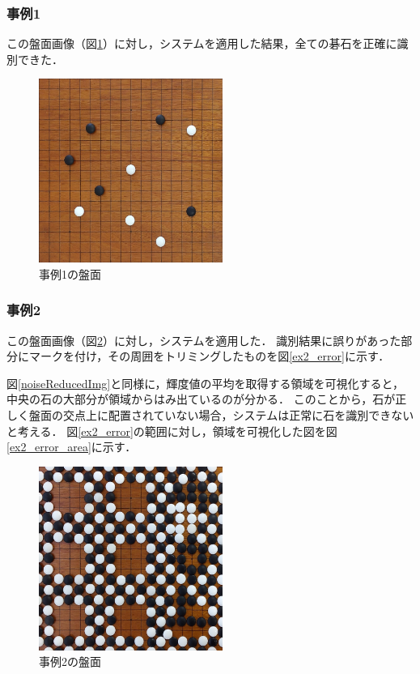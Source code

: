 \documentclass[openright]{nitocs}
\numberwithin{equation}{section}
\begin{document}
            \subsubsection{事例1}
                この盤面画像（図\ref{ex1}）に対し，システムを適用した結果，全ての碁石を正確に識別できた．
                \begin{figure}[tb] %
                    \begin{center}
                    \includegraphics[clip,width=60mm]{DSC_0041/boardImg.jpg} 
                    \caption{事例1の盤面}
                    \label{ex1}
                    \end{center}
                \end{figure}

            \subsubsection{事例2} %
                この盤面画像（図\ref{ex2}）に対し，システムを適用した．
                識別結果に誤りがあった部分にマークを付け，その周囲をトリミングしたものを図\ref{ex2_error}に示す．

                図\ref{noiseReducedImg}と同様に，輝度値の平均を取得する領域を可視化すると，中央の石の大部分が領域からはみ出ているのが分かる．
                このことから，石が正しく盤面の交点上に配置されていない場合，システムは正常に石を識別できないと考える．
                図\ref{ex2_error}の範囲に対し，領域を可視化した図を図\ref{ex2_error_area}に示す．
                
                \begin{figure}[tb] %
                    \begin{center}
                    \includegraphics[clip,width=60mm]{DSC_0099/boardImg.jpg} 
                    \caption{事例2の盤面}
                    \label{ex2}
                    \end{center}
                \end{figure}
\end{document}
